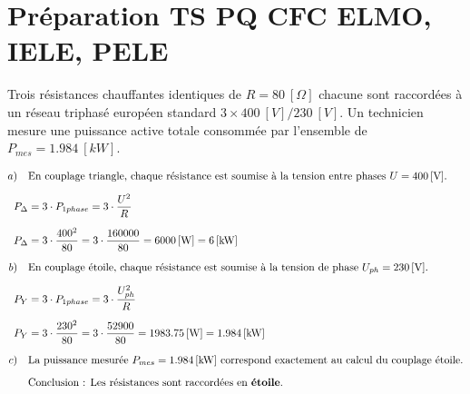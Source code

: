 \documentclass[a4paper,11pt,answers,addpoints]{exam}
\begin{document}
\unframedsolutions
\pointsinmargin
\bracketedpoints

\section*{Préparation TS PQ CFC ELMO, IELE, PELE}

\begin{questions}
\question
Trois résistances chauffantes identiques de $R = \qty{80}{[\Omega]}$ chacune sont raccordées à un réseau triphasé européen standard $3 \times \qty{400}{[V]} / \qty{230}{[V]}$. Un technicien mesure une puissance active totale consommée par l'ensemble de $P_{mes} = \qty{1,984}{[kW]}$.

\vspace{0.5em}
\begin{solution}
	\begin{align*}
		a) \quad &\text{En couplage triangle, chaque résistance est soumise à la tension entre phases } U = \qty{400}{[V]}. \\[6pt]
		P_{\Delta} &= 3 \cdot P_{1phase} = 3 \cdot \dfrac{U^2}{R} \\[6pt]
		P_{\Delta} &= 3 \cdot \dfrac{400^2}{80} = 3 \cdot \dfrac{160000}{80} = \qty{6000}{[W]} = \qty{6}{[kW]} \\[6pt]
		b) \quad &\text{En couplage étoile, chaque résistance est soumise à la tension de phase } U_{ph} = \qty{230}{[V]}. \\[6pt]
		P_{Y} &= 3 \cdot P_{1phase} = 3 \cdot \dfrac{U_{ph}^2}{R} \\[6pt]
		P_{Y} &= 3 \cdot \dfrac{230^2}{80} = 3 \cdot \dfrac{52900}{80} = \qty{1983,75}{[W]} = \qty{1,984}{[kW]} \\[6pt]
		c) \quad &\text{La puissance mesurée } P_{mes} = \qty{1,984}{[kW]} \text{ correspond exactement au calcul du couplage étoile.} \\[6pt]
		&\text{Conclusion : Les résistances sont raccordées en \textbf{étoile}.} \\
	\end{align*}
	

\end{solution}
\end{questions}
\end{document}
